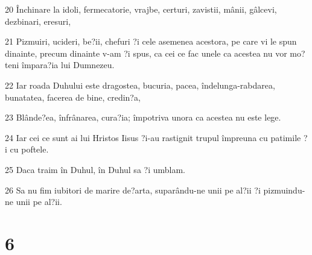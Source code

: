 \par 20 Închinare la idoli, fermecatorie, vrajbe, certuri, zavistii, mânii, gâlcevi, dezbinari, eresuri,
\par 21 Pizmuiri, ucideri, be?ii, chefuri ?i cele asemenea acestora, pe care vi le spun dinainte, precum dinainte v-am ?i spus, ca cei ce fac unele ca acestea nu vor mo?teni împara?ia lui Dumnezeu.
\par 22 Iar roada Duhului este dragostea, bucuria, pacea, îndelunga-rabdarea, bunatatea, facerea de bine, credin?a,
\par 23 Blânde?ea, înfrânarea, cura?ia; împotriva unora ca acestea nu este lege.
\par 24 Iar cei ce sunt ai lui Hristos Iisus ?i-au rastignit trupul împreuna cu patimile ?i cu poftele.
\par 25 Daca traim în Duhul, în Duhul sa ?i umblam.
\par 26 Sa nu fim iubitori de marire de?arta, suparându-ne unii pe al?ii ?i pizmuindu-ne unii pe al?ii.

\chapter{6}

